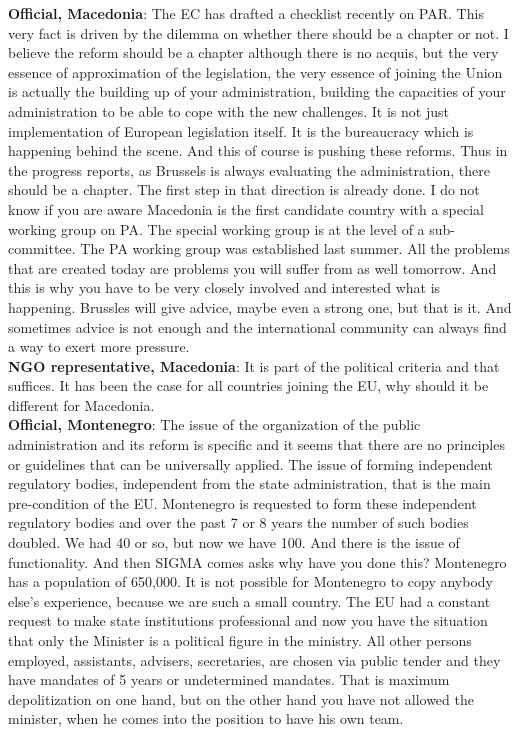 \textbf{Official, Macedonia}: The EC has drafted a checklist recently on PAR. This very fact is driven by the dilemma on whether there should be a chapter or not. I believe the reform should be a chapter although there is no acquis, but the very essence of approximation of the legislation, the very essence of joining the Union is actually the building up of your administration, building the capacities of your administration to be able to cope with the new challenges. It is not just implementation of European legislation itself. It is the bureaucracy which is happening behind the scene. And this of course is pushing these reforms. Thus in the progress reports, as Brussels is always evaluating the administration, there should be a chapter. The first step in that direction is already done. I do not know if you are aware Macedonia is the first candidate country with a special working group on PA. The special working group is at the level of a sub-committee. The PA working group was established last summer. All the problems that are created today are problems you will suffer from as well tomorrow. And this is why you have to be very closely involved and interested what is happening. Brussles will give advice, maybe even a strong one, but that is it. And sometimes advice is not enough and the international community can always find a way to exert more pressure. \\
\textbf{NGO representative, Macedonia}: It is part of the political criteria and that suffices. It has been the case for all countries joining the EU, why should it be different for Macedonia. \\
\textbf{Official, Montenegro}: The issue of the organization of the public administration and its reform is specific and it seems that there are no principles or guidelines that can be universally applied. The issue of forming independent regulatory bodies, independent from the state administration, that is the main pre-condition of the EU. Montenegro is requested to form these independent regulatory bodies and over the past 7 or 8 years the number of such bodies doubled. We had 40 or so, but now we have 100. And there is the issue of functionality. And then SIGMA comes asks why have you done this? Montenegro has a population of 650,000. It is not possible for Montenegro to copy anybody else’s experience, because we are such a small country. The EU had a constant request to make state institutions professional and now you have the situation that only the Minister is a political figure in the ministry. All other persons employed, assistants, advisers, secretaries, are chosen via public tender and they have mandates of 5 years or undetermined mandates. That is maximum depolitization on one hand, but on the other hand you have not allowed the minister, when he comes into the position to have his own team.  \\
